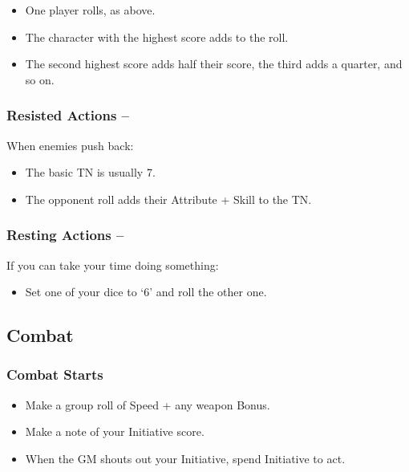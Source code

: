 \begin{multicols}{2}
\begin{itemize}
	\item{One player rolls, as above.}
	\item{The character with the highest score adds to the roll.}
	\item{The second highest score adds half their score, the third adds a quarter, and so on.}

\end{itemize}

\subsubsection{Resisted Actions -- \pageref{resistedactions}}

When enemies push back:

\begin{itemize}

	\item{The basic TN is usually 7.}
	\item{The opponent roll adds their Attribute + Skill to the TN.}

\end{itemize}

\subsubsection{Resting Actions -- \pageref{restingactions}}

If you can take your time doing something:

\begin{itemize}

	\item{Set one of your dice to `6' and roll the other one.}
	
\end{itemize}

\subsection{Combat}

\subsubsection{Combat Starts}

\begin{itemize}

	\item{Make a group roll of Speed + any weapon Bonus.}
	\item{Make a note of your Initiative score.}
	\item{When the GM shouts out your Initiative, spend Initiative to act.}


\end{itemize}
\end{multicols}
